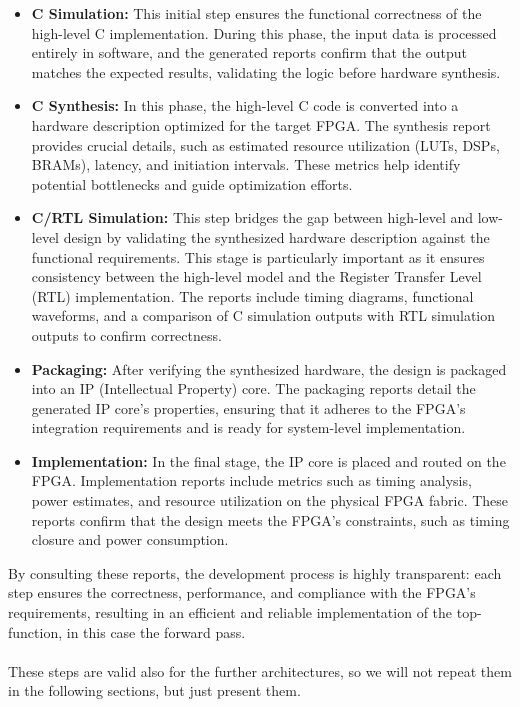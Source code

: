 \documentclass{article}
\begin{document}
\begin{itemize}
    \item \textbf{C Simulation:} This initial step ensures the functional correctness of the high-level C implementation. During this phase, the input data is processed entirely in software, and the generated reports confirm that the output matches the expected results, validating the logic before hardware synthesis.

    \item \textbf{C Synthesis:} In this phase, the high-level C code is converted into a hardware description optimized for the target FPGA. The synthesis report provides crucial details, such as estimated resource utilization (LUTs, DSPs, BRAMs), latency, and initiation intervals. These metrics help identify potential bottlenecks and guide optimization efforts.

    \item \textbf{C/RTL Simulation:} This step bridges the gap between high-level and low-level design by validating the synthesized hardware description against the functional requirements. This stage is particularly important as it ensures consistency between the high-level model and the Register Transfer Level (RTL) implementation. The reports include timing diagrams, functional waveforms, and a comparison of C simulation outputs with RTL simulation outputs to confirm correctness.

    \item \textbf{Packaging:} After verifying the synthesized hardware, the design is packaged into an IP (Intellectual Property) core. The packaging reports detail the generated IP core's properties, ensuring that it adheres to the FPGA's integration requirements and is ready for system-level implementation.

    \item \textbf{Implementation:} In the final stage, the IP core is placed and routed on the FPGA. Implementation reports include metrics such as timing analysis, power estimates, and resource utilization on the physical FPGA fabric. These reports confirm that the design meets the FPGA's constraints, such as timing closure and power consumption.

\end{itemize}
By consulting these reports, the development process is highly transparent: each step ensures the correctness, performance, and compliance with the FPGA's requirements, resulting in an efficient and reliable implementation of the top-function, in this case the forward pass.
\\\\These steps are valid also for the further architectures, so we will not repeat them in the following sections, but just present them.
\end{document}
